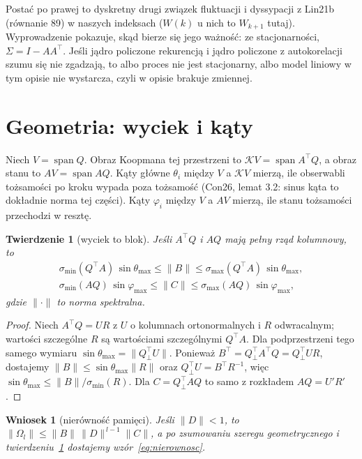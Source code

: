 \documentclass[11pt,a4paper]{article}
\newtheorem{twierdzenie}{Twierdzenie}
\newtheorem{wniosek}{Wniosek}
\theoremstyle{definition}
\theoremstyle{remark}
\newcommand{\Qp}{Q_{\perp}}
\newcommand{\T}{^{\top}}
\newcommand{\norm}[1]{\lVert #1\rVert}
\newcommand{\smax}{\sigma_{\max}}
\newcommand{\smin}{\sigma_{\min}}
\begin{document}
Postać po prawej to dyskretny drugi związek fluktuacji i dyssypacji z Lin21b (równanie 89) w naszych
indeksach ($W(k)$ u nich to $W_{k+1}$ tutaj). Wyprowadzenie pokazuje, skąd bierze się jego ważność:
ze stacjonarności, $\Sigma = I - AA\T$. Jeśli jądro policzone rekurencją i jądro policzone z autokorelacji
szumu się nie zgadzają, to albo proces nie jest stacjonarny, albo model liniowy w tym opisie nie
wystarcza, czyli w opisie brakuje zmiennej.

\section{Geometria: wyciek i kąty}

Niech $V = \operatorname{span} Q$. Obraz Koopmana tej przestrzeni to $\mathcal K V = \operatorname{span} A\T Q$,
a obraz stanu to $AV = \operatorname{span} AQ$. Kąty główne $\theta_i$ między $V$ a $\mathcal K V$ mierzą,
ile obserwabli tożsamości po kroku wypada poza tożsamość (Con26, lemat 3.2: sinus kąta to dokładnie norma
tej części). Kąty $\varphi_i$ między $V$ a $AV$ mierzą, ile stanu tożsamości przechodzi w resztę.

\begin{twierdzenie}[wyciek to blok]\label{tw:katy}
Jeśli $A\T Q$ i $AQ$ mają pełny rząd kolumnowy, to
\begin{gather*}
\smin(Q\T A)\,\sin\theta_{\max} \le \norm{B} \le \smax(Q\T A)\,\sin\theta_{\max},\\
\smin(AQ)\,\sin\varphi_{\max} \le \norm{C} \le \smax(AQ)\,\sin\varphi_{\max},
\end{gather*}
gdzie $\norm{\cdot}$ to norma spektralna.
\end{twierdzenie}

\begin{proof}
Niech $A\T Q = U R$ z $U$ o kolumnach ortonormalnych i $R$ odwracalnym; wartości szczególne $R$ są
wartościami szczególnymi $Q\T A$. Dla podprzestrzeni tego samego wymiaru
$\sin\theta_{\max} = \norm{\Qp\T U}$. Ponieważ $B\T = \Qp\T A\T Q = \Qp\T U R$, dostajemy
$\norm{B}\le \sin\theta_{\max}\norm{R}$ oraz $\Qp\T U = B\T R^{-1}$, więc
$\sin\theta_{\max}\le\norm{B}/\smin(R)$. Dla $C = \Qp\T A Q$ to samo z rozkładem $AQ = U'R'$.
\end{proof}

\begin{wniosek}[nierówność pamięci]
Jeśli $\norm{D}<1$, to $\norm{\Omega_l}\le\norm{B}\,\norm{D}^{\,l-1}\norm{C}$, a po zsumowaniu szeregu
geometrycznego i twierdzeniu~\ref{tw:katy} dostajemy wzór~\eqref{eq:nierownosc}.
\end{wniosek}
\end{document}

